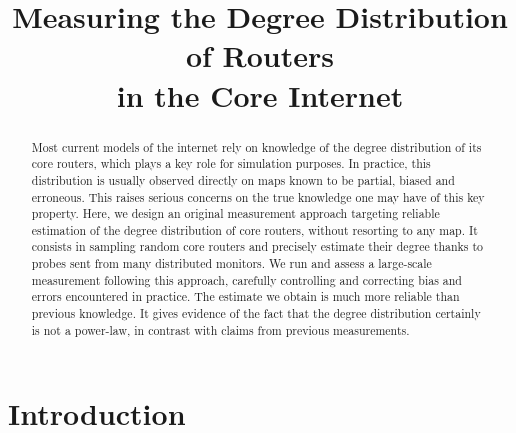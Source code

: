 \documentclass[conference]{IEEEtran}
\newcommand{\noteperso}[1]{\begin{center}
\fbox{\begin{minipage}{0.9\columnwidth}#1\end{minipage}}\end{center}}
\begin{document}
\title{Measuring the Degree Distribution of Routers\\ in the Core Internet}

\author{
\and
{}
\and
{}
\and
{}
}

\maketitle

\begin{abstract}
Most current models of the internet rely on knowledge of the degree distribution of its core routers, which plays a key role for simulation purposes. In practice, this distribution is usually observed directly on maps known to be partial, biased and erroneous. This raises serious concerns on the true knowledge one may have of this key property. Here, we design an original measurement approach targeting reliable estimation of the degree distribution of core routers, without resorting to any map. It consists in sampling random core routers and precisely estimate their degree thanks to probes sent from many distributed monitors. We run and assess a large-scale measurement following this approach, carefully controlling and correcting bias and errors encountered in practice. The estimate we obtain is much more reliable than previous knowledge. It gives evidence of the fact that the degree distribution certainly is not a power-law, in contrast with claims from previous measurements.
\end{abstract}



\section{Introduction} \label{sec:intro}
\end{document}
